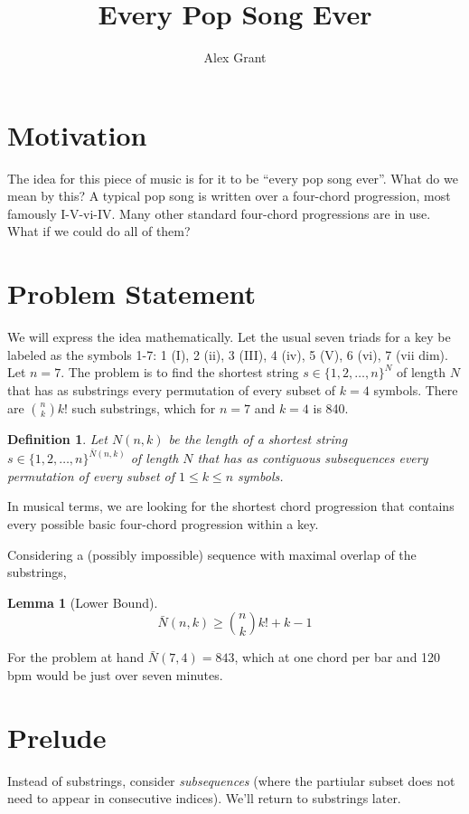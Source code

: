 \documentclass{article}
\title{Every Pop Song Ever}
\author{Alex Grant}
\newtheorem{lemma}{Lemma}
\newtheorem{definition}{Definition}
\begin{document}
\maketitle
\section{Motivation}
The idea for this piece of music is for it to be ``every pop song
ever''. What do we mean by this? A typical pop song is written over a
four-chord progression, most famously I-V-vi-IV. Many other standard
four-chord progressions are in use. What if we could do all of them?

\section{Problem Statement}
We will express the idea mathematically. Let the usual seven triads
for a key be labeled as the symbols 1-7: 1 (I), 2 (ii), 3 (III), 4
(iv), 5 (V), 6 (vi), 7 (vii dim). Let $n=7$. The problem is to find
the shortest string $s\in\{1,2,\dots,n\}^N$ of length $N$ that has as
substrings every permutation of every subset of $k=4$ symbols. There
are $\binom{n}{k}k!$ such substrings, which for $n=7$ and $k=4$ is
840. 

\begin{definition}
  Let $N(n,k)$ be the length of a shortest string
  $s\in\{1,2,\dots,n\}^{\bar{N}(n,k)}$ of length $N$ that has as
  contiguous subsequences every permutation of every subset of
  $1\leq k\leq n$ symbols.
\end{definition}
In musical terms, we are looking for the shortest chord progression
that contains every possible basic four-chord progression within a
key.

Considering a (possibly impossible) sequence with maximal overlap of
the substrings,
\begin{lemma}[Lower Bound]
  \begin{equation*}
  \bar{N}(n,k) \geq \binom{n}{k}k! + k-1
\end{equation*}
\end{lemma}
For the problem at hand $\bar{N}(7,4) = 843$, which at one chord per
bar and 120 bpm would be just over seven minutes.

\section{Prelude}
Instead of substrings, consider \emph{subsequences}
(where the partiular subset does not need to appear in consecutive
indices). We'll return to substrings later.
\end{document}
